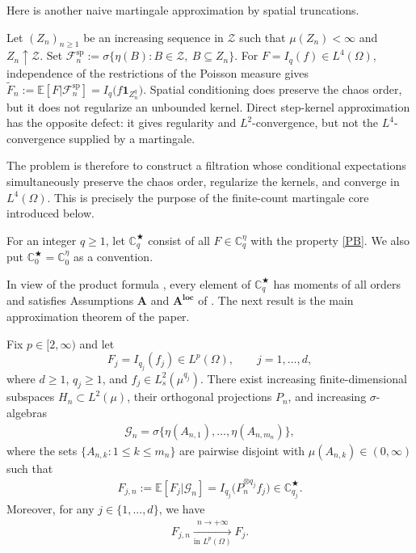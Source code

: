 \documentclass[ECP,preprint]{ejpecp}
\newcommand{\E}{\mathbb{E}}
\newcommand{\ind}{\mathbf{1}}
\newcommand{\cG}{\mathcal{G}}
\newcommand{\cZ}{\mathcal{Z}}
\newcommand{\cF}{\mathcal{F}}
\newcommand{\sZ}{\mathscr{Z}}
\newcommand{\bC}{\mathbb{C}^\eta}
\newcommand{\fin}{\mathbb{C}^{\bigstar}}
\newcommand{\s}{\sigma}
\newcommand{\wt}{\widetilde}
\begin{document}
Here is another  naive  martingale approximation by  spatial truncations. 

\begin{example}  \label{ex2} \rm
 Let
$(Z_n)_{n\geq1}$ be an increasing sequence in $\sZ$ such that
$\mu(Z_n)<\infty$
and
$Z_n\uparrow \cZ$.
Set
$
\mathcal F_n^{\mathrm{sp}}
:=
\sigma\big\{
\eta(B):B\in\sZ,\ B\subseteq Z_n
\big\}.
$
For $F=I_q(f)\in L^4(\Omega)$, independence of the restrictions of
the Poisson measure gives
$
\wt{F}_n
:=
\E[F | \cF_n^{\mathrm{sp}}]
=
I_q\bigl(f\ind_{Z_n^q}\bigr).
$
Spatial conditioning does preserve the chaos order,
but it does not regularize an unbounded kernel. 
Direct step-kernel approximation has the opposite defect: it gives regularity and 
$L^2$-convergence, but not the $L^4$-convergence supplied by a martingale.



\end{example}

 
The problem is
therefore to construct a filtration whose conditional expectations
simultaneously preserve the chaos order, regularize the kernels,
and converge in $L^4(\Omega)$.  
This is precisely the purpose of the
finite-count martingale core introduced below.

\begin{definition}
\label{def_core}
For an integer $q\geq1$, let $\fin_q$ consist of all $F\in\bC_q$
with the property \eqref{PB}.
 We also put $\fin_0 = \bC_0$ as a convention.
\end{definition}

In view of the product formula \cite{Surg84, DPF18},
every element of $\fin_q$ has moments of all orders and
satisfies Assumptions $\mathbf A$ and $\mathbf{A}^{\textbf{loc}}$ of
\cite{DP18}.  The next result is the main approximation theorem of the
paper.

\begin{theorem}
\label{thm_core}
Fix $p\in[2,\infty)$ and let
\[
  F_j=I_{q_j}(f_j)\in L^p(\Omega),
  \qquad j=1,\ldots,d,
\]
where $d\geq1$, $q_j\geq1$, and
$f_j\in L_s^2(\mu^{q_j})$.  There exist increasing finite-dimensional
subspaces $H_n\subset L^2(\mu)$, their orthogonal projections $P_n$,
and increasing $\s$-algebras
\begin{align}
  \cG_n
  =\sigma\big\{ \eta(A_{n,1}),\ldots,\eta(A_{n,m_n})\big\},
  \label{Gn_def}
\end{align}
where the sets $\{A_{n,k}: 1\leq k \leq m_n\}$ are pairwise disjoint 
with $\mu( A_{n,k})\in(0, \infty)$
such that
\begin{align}
  F_{j,n}
  :=\E[F_j|\cG_n]
  =I_{q_j}\bigl(P_n^{\otimes q_j}f_j\bigr)
  \in\fin_{q_j}.
  \label{core_id}
\end{align}
Moreover, for any $j\in\{1, ...,d\}$,
we have
\begin{align}
  F_{j,n}\xrightarrow[\text{in }L^p(\Omega)]{n\to+\infty} F_j.
  \label{core_Lp}
\end{align}




\end{theorem}
\end{document}
